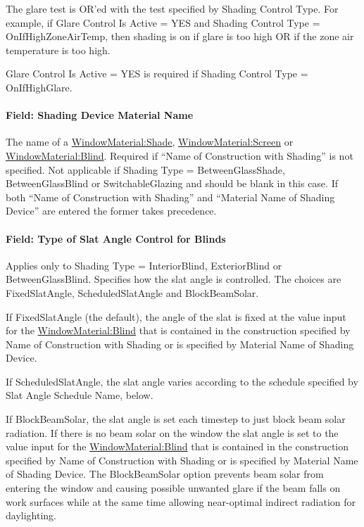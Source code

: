 The glare test is OR'ed with the test specified by Shading Control Type. For example, if Glare Control Is Active = YES and Shading Control Type = OnIfHighZoneAirTemp, then shading is on if glare is too high OR if the zone air temperature is too high.

Glare Control Is Active = YES is required if Shading Control Type = OnIfHighGlare.

\paragraph{Field: Shading Device Material Name}\label{field-shading-device-material-name}

The name of a \hyperref[windowmaterialshade]{WindowMaterial:Shade}, \hyperref[windowmaterialscreen]{WindowMaterial:Screen} or \hyperref[windowmaterialblind]{WindowMaterial:Blind}. Required if ``Name of Construction with Shading'' is not specified. Not applicable if Shading Type = BetweenGlassShade, BetweenGlassBlind or SwitchableGlazing and should be blank in this case. If both ``Name of Construction with Shading'' and ``Material Name of Shading Device'' are entered the former takes precedence.

\paragraph{Field: Type of Slat Angle Control for Blinds}\label{field-type-of-slat-angle-control-for-blinds}

Applies only to Shading Type = InteriorBlind, ExteriorBlind or BetweenGlassBlind. Specifies how the slat angle is controlled. The choices are FixedSlatAngle, ScheduledSlatAngle and BlockBeamSolar.

If FixedSlatAngle (the default), the angle of the slat is fixed at the value input for the \hyperref[windowmaterialblind]{WindowMaterial:Blind} that is contained in the construction specified by Name of Construction with Shading or is specified by Material Name of Shading Device.

If ScheduledSlatAngle, the slat angle varies according to the schedule specified by Slat Angle Schedule Name, below.

If BlockBeamSolar, the slat angle is set each timestep to just block beam solar radiation. If there is no beam solar on the window the slat angle is set to the value input for the \hyperref[windowmaterialblind]{WindowMaterial:Blind} that is contained in the construction specified by Name of Construction with Shading or is specified by Material Name of Shading Device. The BlockBeamSolar option prevents beam solar from entering the window and causing possible unwanted glare if the beam falls on work surfaces while at the same time allowing near-optimal indirect radiation for daylighting.

